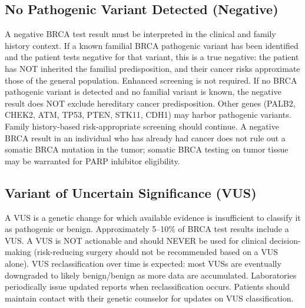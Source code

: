 \subsection*{No Pathogenic Variant Detected (Negative)}
A negative BRCA test result must be interpreted in the clinical and family history context. If a known familial BRCA pathogenic variant has been identified and the patient tests negative for that variant, this is a true negative: the patient has NOT inherited the familial predisposition, and their cancer risks approximate those of the general population. Enhanced screening is not required. If no BRCA pathogenic variant is detected and no familial variant is known, the negative result does NOT exclude hereditary cancer predisposition. Other genes (PALB2, CHEK2, ATM, TP53, PTEN, STK11, CDH1) may harbor pathogenic variants. Family history-based risk-appropriate screening should continue. A negative BRCA result in an individual who has already had cancer does not rule out a somatic BRCA mutation in the tumor; somatic BRCA testing on tumor tissue may be warranted for PARP inhibitor eligibility.

\subsection*{Variant of Uncertain Significance (VUS)}
A VUS is a genetic change for which available evidence is insufficient to classify it as pathogenic or benign. Approximately 5--10\% of BRCA test results include a VUS. A VUS is NOT actionable and should NEVER be used for clinical decision-making (risk-reducing surgery should not be recommended based on a VUS alone). VUS reclassification over time is expected: most VUSs are eventually downgraded to likely benign/benign as more data are accumulated. Laboratories periodically issue updated reports when reclassification occurs. Patients should maintain contact with their genetic counselor for updates on VUS classification.

